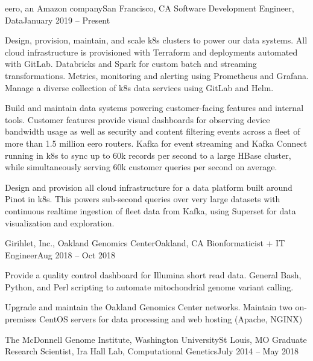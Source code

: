 \resumeSubheading
{eero, an Amazon company}{San Francisco, CA}
{Software Development Engineer, Data}{January 2019 -- Present}

\resumeItemListStart

{Design, provision, maintain, and scale k8s clusters to power our data systems. All cloud infrastructure is provisioned with Terraform and deployments automated with GitLab. Databricks and Spark for custom batch and streaming transformations. Metrics, monitoring and alerting using Prometheus and Grafana. Manage a diverse collection of k8s data services using GitLab and Helm.}

{Build and maintain data systems powering customer-facing features and internal tools. Customer features provide visual dashboards for observing device bandwidth usage as well as security and content filtering events across a fleet of more than 1.5 million eero routers. Kafka for event streaming and Kafka Connect running in k8s to sync up to 60k records per second to a large HBase cluster, while simultaneously serving 60k customer queries per second on average.}

{Design and provision all cloud infrastructure for a data platform built around Pinot in k8s. This powers sub-second queries over very large datasets with continuous realtime ingestion of fleet data from Kafka, using Superset for data visualization and exploration.}

\resumeItemListEnd


\resumeSubheading
{Girihlet, Inc., Oakland Genomics Center}{Oakland, CA}
{Bionformaticist + IT Engineer}{Aug 2018 -- Oct 2018}

\resumeItemListStart

{Provide a quality control dashboard for Illumina short read data. General Bash, Python, and Perl scripting to automate mitochondrial genome variant calling.}

{Upgrade and maintain the Oakland Genomics Center networks. Maintain two on-premises CentOS servers for data processing and web hosting (Apache, NGINX)}

\resumeItemListEnd


\resumeSubheading
{The McDonnell Genome Institute, Washington University}{St Louis, MO}
{Graduate Research Scientist, Ira Hall Lab, Computational Genetics}{July 2014 -- May 2018}

\resumeItemListStart

